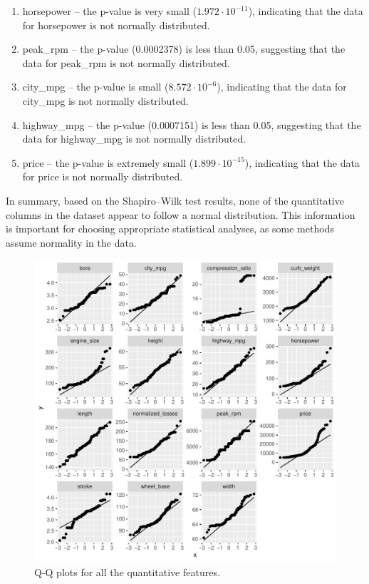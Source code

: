 \documentclass[11pt,a4paper]{article}\usepackage[]{graphicx}\usepackage[]{xcolor}
\makeatletter
\def\maxwidth{ %
  \ifdim\Gin@nat@width>\linewidth
    \linewidth
  \else
    \Gin@nat@width
  \fi
}
\newenvironment{knitrout}{}{} %
\makeatother
\begin{document}
\begin{enumerate}
\item horsepower -- the p-value is very small ($1.972 \cdot 10^{-11}$), indicating that the data for horsepower is not normally distributed.

\item peak\_rpm -- the p-value (0.0002378) is less than 0.05, suggesting that the data for peak\_rpm is not normally distributed.

\item city\_mpg -- the p-value is small ($8.572 \cdot 10^{-6}$), indicating that the data for city\_mpg is not normally distributed.

\item highway\_mpg -- the p-value (0.0007151) is less than 0.05, suggesting that the data for highway\_mpg is not normally distributed.

\item price -- the p-value is extremely small ($1.899 \cdot 10^{-15}$), indicating that the data for price is not normally distributed.

\end{enumerate}

In summary, based on the Shapiro--Wilk test results, none of the quantitative columns in the dataset appear to follow a normal distribution. This information is important for choosing appropriate statistical analyses, as some methods assume normality in the data. 


\begin{knitrout}
\color{fgcolor}\begin{figure}
\includegraphics[width=\maxwidth]{figure/qqplot_EDA-1} \caption[Q-Q plots for all the quantitative features]{Q-Q plots for all the quantitative features.}\label{fig:qqplot_EDA}
\end{figure}

\end{knitrout}
	
\end{document}
